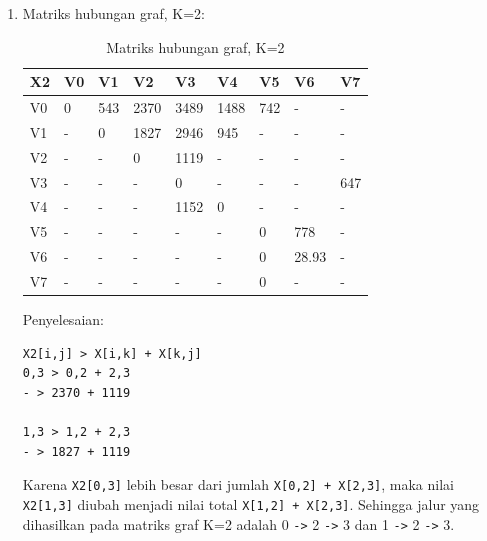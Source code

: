 \begin{enumerate}
\begin{enumerate}
\begin{enumerate}
            \vspace{6.5cm}
            
            \item  Matriks hubungan graf, K=2:
                \begin{table}[!htbp]
                \centering
                \caption{Matriks hubungan graf, K=2}
                \label{table33}
                    \begin{tabular}{|l|l|l|l|l|l|l|l|l|}
                    \hline
                        X2 & V0 & V1 & V2 & V3 & V4 & V5 & V6 & V7 \\
                    \hline
                        V0 & 0 & 543 & 2370 & 3489 & 1488 & 742 & - & - \\
                    \hline
                        V1 & - & 0 & 1827 & 2946 & 945 & - & - & - \\
                    \hline
                        V2 & - & - & 0 & 1119 & - & - & - & - \\
                    \hline
                        V3 & - & - & - & 0 & - & - & - & 647 \\
                    \hline
                        V4 & - & - & - & 1152 & 0 & - & - & - \\
                    \hline
                        V5 & - & - & - & - & - & 0 & 778 & - \\
                    \hline
                       V6 & - & - & - & - & - & 0 & 28.93 & - \\
                    \hline
                       V7 & - & - & - & - & - & 0 & - & - \\
                    \hline
                \end{tabular}
                \end{table}
            \par Penyelesaian:
\begin{verbatim}
X2[i,j] > X[i,k] + X[k,j]
0,3 > 0,2 + 2,3
- > 2370 + 1119

1,3 > 1,2 + 2,3
- > 1827 + 1119
\end{verbatim}

            \par Karena \verb|X2[0,3]| lebih besar dari jumlah \verb|X[0,2] + X[2,3]|, maka nilai \verb|X2[1,3]| diubah menjadi nilai total \verb|X[1,2] + X[2,3]|. Sehingga jalur yang dihasilkan pada matriks graf K=2 adalah 0 \verb|->| 2 \verb|->| 3 dan 1 \verb|->| 2 \verb|->| 3.
            
            \vspace{0.3cm}
            

\end{enumerate}
\end{enumerate}
\end{enumerate}
